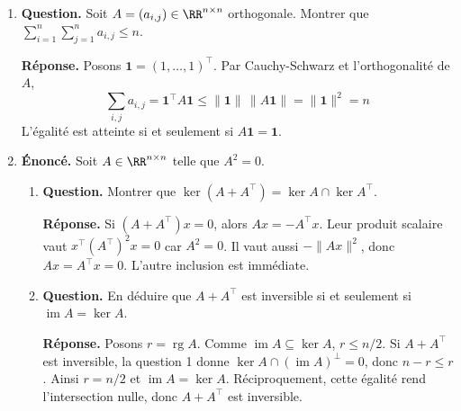\documentclass[12pt, a4paper]{article}
\begin{document}
\begin{enumerate}[label=8.\arabic*., start=70]
\begin{minipage}[t]{\linewidth}
\begin{enumerate}[\arabic*.]
  \item \textbf{Question.} Pour un projecteur orthogonal $p$, montrer que $\|p(x)\|^2=\langle p(x),x\rangle$.
\par\smallskip
\textbf{Réponse.} $\|p(x)\|^2=\langle x,p^2(x)\rangle=\langle x,p(x)\rangle$.

  \item \textbf{Question.} Si $p$ est de rang $r$ et $(e_i)$ une base orthonormée, montrer que $r=\sum_i\|p(e_i)\|^2$.
\par\smallskip
\textbf{Réponse.} Dans une base orthonormale,
        $\sum_i\|p(e_i)\|^2=\sum_i\langle p(e_i),e_i\rangle=\operatorname{tr}p=r$.

\end{enumerate}
\end{minipage}

  \item \begin{minipage}[t]{\linewidth}\raggedright
\textbf{Question.} Soit $A=(a_{i,j})\in\RR^{n\times n}$ orthogonale. Montrer que $\sum_{i=1}^n\sum_{j=1}^na_{i,j}\leq n$.
\par\smallskip
\textbf{Réponse.} Posons $\boldsymbol1=(1,\ldots,1)^\top$. Par Cauchy-Schwarz et l'orthogonalité de $A$,
    \[
      \sum_{i,j}a_{i,j}=\boldsymbol1^\top A\boldsymbol1
      \leq\|\boldsymbol1\|\,\|A\boldsymbol1\|=\|\boldsymbol1\|^2=n
    \]
    L'égalité est atteinte si et seulement si $A\boldsymbol1=\boldsymbol1$.
\end{minipage}

  \item \begin{minipage}[t]{\linewidth}\raggedright
\textbf{Énoncé.} Soit $A\in\RR^{n\times n}$ telle que $A^2=0$.

\begin{enumerate}[\arabic*.]
        \item \textbf{Question.} Montrer que $\ker(A+A^\top)=\ker A\cap\ker A^\top$.
\par\smallskip
\textbf{Réponse.} Si $(A+A^\top)x=0$, alors $Ax=-A^\top x$.
        Leur produit scalaire vaut $x^\top(A^\top)^2x=0$ car $A^2=0$.
        Il vaut aussi $-\|Ax\|^2$, donc $Ax=A^\top x=0$.
        L'autre inclusion est immédiate.

  \item \textbf{Question.} En déduire que $A+A^\top$ est inversible si et seulement si $\operatorname{im}A=\ker A$.
\par\smallskip
\textbf{Réponse.} Posons $r=\operatorname{rg}A$.
        Comme $\operatorname{im}A\subseteq\ker A$, $r\leq n/2$.
        Si $A+A^\top$ est inversible, la question 1 donne
        $\ker A\cap(\operatorname{im}A)^\perp=0$, donc $n-r\leq r$.
        Ainsi $r=n/2$ et $\operatorname{im}A=\ker A$.
        Réciproquement, cette égalité rend l'intersection nulle, donc $A+A^\top$ est inversible.


\end{enumerate}
\end{minipage}
\end{enumerate}
\end{document}
